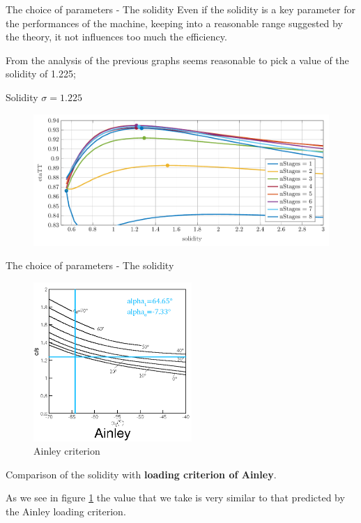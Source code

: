\documentclass{beamer}
\newcommand{\myspace}[0]{\vspace{0.3cm}}
\newcommand{\myspaceneg}[0]{\vspace{-0.15cm}}
\newcommand{\highlightgreenC}[1]{\textcolor{chameleongreen3}{#1}}%
\begin{document}
\begin{frame}[t]{The choice of parameters - The solidity}
Even if the solidity is a key parameter for the performances of the machine, 
keeping into a reasonable range suggested by the theory, it not influences too much the efficiency.

\myspace
\myspaceneg
From the analysis of the previous graphs seems reasonable to pick a value of the solidity of 1.225;
\begin{center}
\large{\highlightgreenC{Solidity $\sigma = 1.225$}}
\end{center}

\myspaceneg
\myspaceneg
\myspaceneg
\begin{figure}[hbtp]
\centering
\includegraphics[scale=0.47]{fig/solidity_wrong.pdf}
\end{figure}
\end{frame}


\begin{frame}[t]{The choice of parameters - The solidity}

\myspaceneg
\myspaceneg
\myspaceneg
\begin{figure}
\centering
\includegraphics[width=6cm]{fig/ainley_loading.png}
\caption{Ainley criterion}
\label{fig:ainley_loading}
\end{figure}

\leavevmode
\newline
\newline
\newline
Comparison of the solidity with \highlightgreenC{\textbf{loading criterion of Ainley}}. 

\myspace
As we see in figure \ref{fig:ainley_loading} the value that we take is very similar to that predicted by the Ainley loading criterion.
\end{frame}
\end{document}
